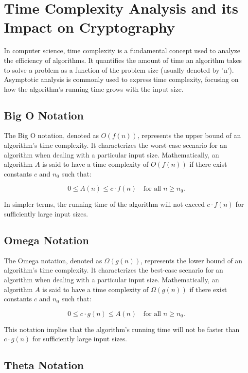 \documentclass{article}
\begin{document}
\section{Time Complexity Analysis and its Impact on Cryptography}

In computer science, time complexity is a fundamental concept used to analyze the efficiency of algorithms. It quantifies the amount of time an algorithm takes to solve a problem as a function of the problem size (usually denoted by 'n'). Asymptotic analysis is commonly used to express time complexity, focusing on how the algorithm's running time grows with the input size.

\subsection{Big O Notation}

The Big O notation, denoted as \(O(f(n))\), represents the upper bound of an algorithm's time complexity. It characterizes the worst-case scenario for an algorithm when dealing with a particular input size. Mathematically, an algorithm \(A\) is said to have a time complexity of \(O(f(n))\) if there exist constants \(c\) and \(n_0\) such that:

\[ 0 \leq A(n) \leq c \cdot f(n) \quad \text{for all } n \geq n_0. \]

In simpler terms, the running time of the algorithm will not exceed \(c \cdot f(n)\) for sufficiently large input sizes.

\subsection{Omega Notation}

The Omega notation, denoted as \(\Omega(g(n))\), represents the lower bound of an algorithm's time complexity. It characterizes the best-case scenario for an algorithm when dealing with a particular input size. Mathematically, an algorithm \(A\) is said to have a time complexity of \(\Omega(g(n))\) if there exist constants \(c\) and \(n_0\) such that:

\[ 0 \leq c \cdot g(n) \leq A(n) \quad \text{for all } n \geq n_0. \]

This notation implies that the algorithm's running time will not be faster than \(c \cdot g(n)\) for sufficiently large input sizes.

\subsection{Theta Notation}
\end{document}
